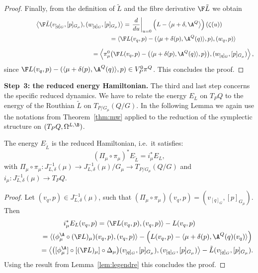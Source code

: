 \begin{proof}
Finally, from the def\/inition of $\tilde L$ and the f\/ibre derivative $\F\tilde L$ we obtain
\begin{gather*}
\left\langle \F\tilde L(v_{[q]_G},[p]_{G_\mu}) , (w_{[q]_G},[p]_{G_\mu})\right\rangle
=\left.\frac{d}{du}\right|_{u=0}\left(L - \big\langle\mu+\delta, \A^Q\big\rangle\right)(\zeta(u))\\
\phantom{\left\langle \F\tilde L(v_{[q]_G},[p]_{G_\mu}) , (w_{[q]_G},[p]_{G_\mu})\right\rangle}{}
= \langle \F L(v_q,p)-(\langle\mu+\delta(p),\A^Q(q) \rangle, p),(w_q,p)\rangle\\[2mm]
\phantom{\left\langle \F\tilde L(v_{[q]_G},[p]_{G_\mu}) , (w_{[q]_G},[p]_{G_\mu})\right\rangle}{}
= \left\langle \pi^0_\mu\big(\F L(v_q,p)-\big(\langle \mu+\delta(p),\A^Q(q)\rangle,p\big)\big), (w_{[q]_G},[p]_{G_\mu})\right\rangle,
\end{gather*}
since $\F L(v_q,p)-(\langle \mu+\delta(p),\A^Q(q)\rangle,p) \in V^0_P\pi^Q$. This  concludes the proof.
\end{proof}

{\bf Step~3: the reduced energy Hamiltonian.}
The third and last step concerns the specif\/ic reduced dynamics. We have to relate the energy $E_L$  on $T_PQ$ to the energy of the Routhian $\tilde L$ on $T_{P/G_\mu}(Q/G)$.   In the following Lemma we again use the notations from Theorem~\ref{thm:mw} applied to the reduction of the symplectic structure on $(T_PQ,\Omega^{L,\B})$.
\begin{lemma}\label{lem:energy}
  The energy $E_{\tilde L}$ is the reduced Hamiltonian, i.e.\ it satisfies:
  \[
  (\Pi_\mu\circ\pi_\mu)^*E_{\tilde L} = i^*_\mu E_L,
  \]
  with $\Pi_\mu\circ\pi_\mu: J^{-1}_{L,\delta}(\mu)\to J^{-1}_{L,\delta}(\mu)/G_\mu\to T_{P/G_\mu}(Q/G)$ and $i_\mu:J^{-1}_{L,\delta}(\mu)\to T_PQ$.
\end{lemma}
\begin{proof}
Let $(v_q,p)\in J^{-1}_{L,\delta}(\mu)$, such that $(\Pi_\mu\circ\pi_\mu)(v_q,p)=(v_{[q]_G},[p]_{G_\mu})$. Then
\begin{gather*}
  i^*_\mu E_L(v_q,p) = \langle\F L(v_q,p),(v_q,p)\rangle-L(v_q,p)\\
  \phantom{i^*_\mu E_L(v_q,p)}{}
  = \langle  (\phi^\A_\mu\circ(\F L)_\mu)(v_q,p),(v_q,p)\rangle - \left(L(v_q,p)-\langle \mu+\delta(p),\A^Q(q)(v_q)\rangle\right)\\
 \phantom{i^*_\mu E_L(v_q,p)}{}
 = \left\langle \big([\phi^\A_\mu]\circ[(\F L)_\mu]\circ\Delta_\mu\big)(v_{[q]_G},[p]_{G_\mu}),(v_{[q]_G},[p]_{G_\mu})\right\rangle - \tilde L (v_{[q]_G},[p]_{G_\mu}).
\end{gather*}
Using the result from Lemma~\ref{lem:legendre} this concludes the proof.
\end{proof}

